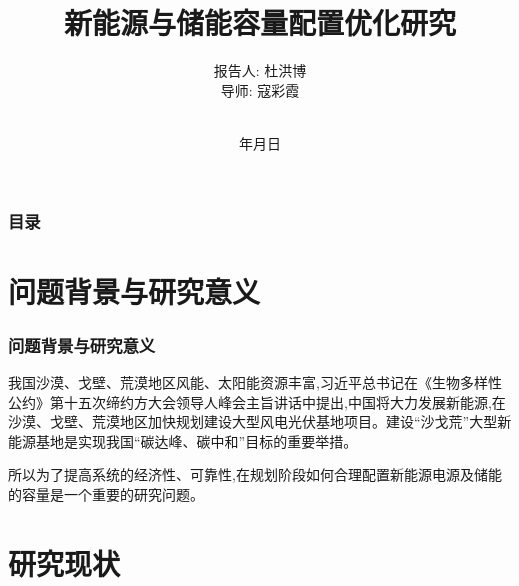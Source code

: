 \documentclass{beamer}
\renewcommand{\today}{\number\year 年\number\month 月\number\day 日}
\begin{document}
\justifying
\title[新能源与储能容量配置优化研究]%
{新能源与储能容量配置优化研究}

\author[杜洪博]%
{报告人: 杜洪博\\
导\quad 师: 寇彩霞\rule[0pt]{0pt}{20pt}\\}

\institute[BUPT]{\textcolor[rgb]{0.0,0.0,0.10}%
{\small\ttfamily 北京邮电大学\ 理学院\\[10pt]}}

\date{\today}

\begin{frame}[plain]
	\titlepage
\end{frame}

\begin{frame}
	\frametitle{目录}
	\tableofcontents[hideallsubsections] %
\end{frame}

\AtBeginSection[] %
{ \begin{frame}<beamer> %
		\tableofcontents[currentsection,hideallsubsections]%
	\end{frame}
}


\section{问题背景与研究意义}

\begin{frame}
	\frametitle{问题背景与研究意义} 
	\qquad 我国沙漠、戈壁、荒漠地区风能、太阳能资源丰富,习近平总书记在《生物多样性公约》第十五次缔约方大会领导人峰会主旨讲话中提出,中国将大力发展新能源,在沙漠、戈壁、荒漠地区加快规划建设大型风电光伏基地项目。建设“沙戈荒”大型新能源基地是实现我国“碳达峰、碳中和”目标的重要举措。
	
	\qquad 所以为了提高系统的经济性、可靠性,在规划阶段如何合理配置新能源电源及储能的容量是一个重要的研究问题。
	
\end{frame}

\section{研究现状}
\end{document}
